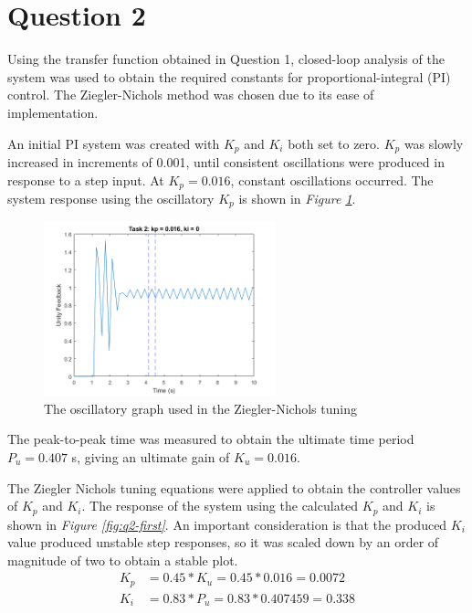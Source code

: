 \documentclass[11pt, onecolumn]{article}
\begin{document}
\section*{Question 2}
\par Using the transfer function obtained in Question 1, closed-loop analysis of the system was used to obtain the required constants for proportional-integral (PI) control. The Ziegler-Nichols method was chosen due to its ease of implementation.
\par An initial PI system was created with $K_p$ and $K_i$ both set to zero. $K_p$ was slowly increased in increments of 0.001, until consistent oscillations were produced in response to a step input. At $K_p = 0.016$, constant oscillations occurred. The system response using the oscillatory $K_p$ is shown in \textit{Figure \ref{fig:q2-oscillatory}}.
\begin{figure}[h!]
    \centering
    \includegraphics[width=0.6\textwidth]{q2-g1.png}
    \caption{The oscillatory graph used in the Ziegler-Nichols tuning}
    \label{fig:q2-oscillatory}
\end{figure}
\par The peak-to-peak time was measured to obtain the ultimate time period $P_u = 0.407$ s, giving an ultimate gain of $K_u = 0.016$.
\par The Ziegler Nichols tuning equations were applied to obtain the controller values of $K_p$ and $K_i$. The response of the system using the calculated $K_p$ and $K_i$ is shown in \textit{Figure \ref{fig:q2-first}}. An important consideration is that the produced $K_i$ value produced unstable step responses, so it was scaled down by an order of magnitude of two to obtain a stable plot.
\begin{align*}
    K_p & = 0.45 * K_u = 0.45 * 0.016 = 0.0072   \\
    K_i & = 0.83 * P_u = 0.83 * 0.407459 = 0.338
\end{align*}
\end{document}
